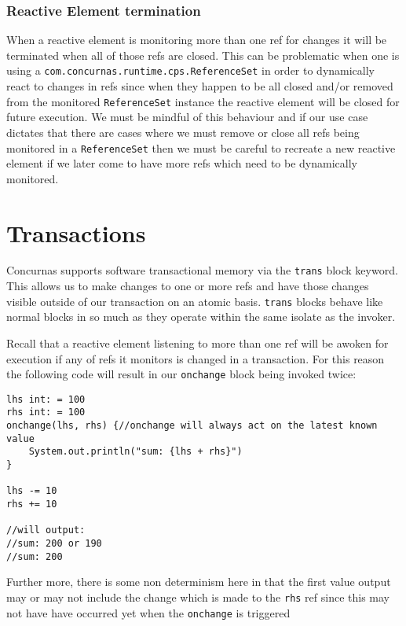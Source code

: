 \documentclass[conc-doc]{subfiles}
\begin{document}
\subsubsection{Reactive Element termination}
When a reactive element is monitoring more than one ref for changes it will be terminated when all of those refs are closed. This can be problematic when one is using a \lstinline{com.concurnas.runtime.cps.ReferenceSet} in order to dynamically react to changes in refs since when they happen to be all closed and/or removed from the monitored \lstinline{ReferenceSet} instance the reactive element will be closed for future execution. We must be mindful of this behaviour and if our use case dictates that there are cases where we must remove or close all refs being monitored in a \lstinline{ReferenceSet} then we must be careful to recreate a new reactive element if we later come to have more refs which need to be dynamically monitored.





\section{Transactions}
Concurnas supports software transactional memory via the \lstinline{trans} block keyword. This allows us to make changes to one or more refs and have those changes visible outside of our transaction on an atomic basis. \lstinline{trans} blocks behave like normal blocks in so much as they operate within the same isolate as the invoker.

Recall that a reactive element listening to more than one ref will be awoken for execution if any of refs it monitors is changed in a transaction. For this reason the following code will result in our \lstinline{onchange} block being invoked twice:

\begin{lstlisting}
lhs int: = 100
rhs int: = 100
onchange(lhs, rhs) {//onchange will always act on the latest known value
	System.out.println("sum: {lhs + rhs}")
}

lhs -= 10
rhs += 10

//will output:
//sum: 200 or 190
//sum: 200
\end{lstlisting}

Further more, there is some non determinism here in that the first value output may or may not include the change which is made to the \lstinline{rhs} ref since this may not have have occurred yet when the \lstinline{onchange} is triggered 
\end{document}
